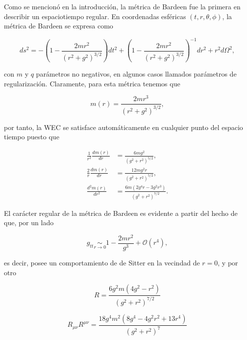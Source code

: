 \documentclass{article}
\numberwithin{equation}{section}
\begin{document}
Como se mencionó en la introducción, la métrica de Bardeen \cite{bardeen,borde1994,borde1996} fue la primera en describir un espaciotiempo regular. En coordenadas esféricas $(t,r,\theta,\phi)$, la métrica de Bardeen se expresa como

\begin{equation}
\label{bardeen metric}
ds^2 = -\left( 1 - \frac{2mr^2}{(r^2 + g^2)^{3/2}} \right)dt^2 + \left( 1 - \frac{2mr^2}{(r^2 + g^2)^{3/2}} \right)^{-1}dr^2 + r^2d\Omega^2,
\end{equation}

con $m$ y $q$ parámetros no negativos, en algunos casos llamados parámetros de regularización. Claramente, para esta métrica tenemos que 

\begin{equation}
m(r) = \frac{2mr^3}{(r^2 + g^2)^{3/2}},
\end{equation}

por tanto, la WEC se satisface automáticamente en cualquier punto del espacio tiempo puesto que 

\begin{align}
\frac{1}{r^2}\frac{dm(r)}{dr} &= \frac{6 m g^2}{\left(g^2+r^2\right)^{5/2}},\\
\frac{2}{r}\frac{dm(r)}{dr} &= \frac{12 m g^2 r}{\left(g^2+r^2\right)^{5/2}},\\
\frac{d^2m(r)}{dr^2} &= \frac{6 m \left(2 g^4 r-3 g^2 r^3\right)}{\left(g^2+r^2\right)^{7/2}}.
\end{align}

El carácter regular de la métrica de Bardeen es evidente a partir del hecho de que, por un lado

\begin{equation}
g_{tt} \underset{r \to 0}{\sim} 1 - \frac{2mr^2}{g^3} + \mathcal{O}(r^4),
\end{equation}

es decir, posee un comportamiento de de Sitter en la vecindad de $r = 0$, y por otro

\begin{equation}
\label{bardeen scalar}
R = \frac{6 g^2 m \left(4 g^2-r^2\right)}{\left(g^2+r^2\right)^{7/2}}
\end{equation}

\begin{equation}
\label{bardeen ricci scalar}
R_{\mu \nu}R^{\mu \nu} = \frac{18 g^4 m^2 \left(8 g^4-4 g^2 r^2+13 r^4\right)}{\left(g^2+r^2\right)^7}
\end{equation}
\end{document}

